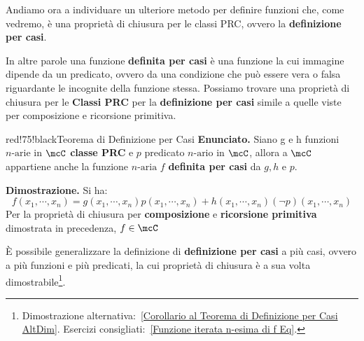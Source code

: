Andiamo ora a individuare un ulteriore metodo per definire funzioni che, come vedremo, è una proprietà di chiusura per le classi PRC, ovvero la \textbf{definizione per casi}.


In altre parole una funzione \textbf{definita per casi} è una funzione la cui immagine dipende da un predicato, ovvero da una condizione che può essere vera o falsa riguardante le incognite della funzione stessa.
Possiamo trovare una proprietà di chiusura per le \textbf{Classi PRC} per la \textbf{definizione per casi} simile a quelle viste per composizione e ricorsione primitiva.

\begin{halfframedbox}{red!75!black}{Teorema di Definizione per Casi}\label{Definizione per Casi Teorema}
  \textbf{Enunciato.} Siano g e h funzioni \(n\text{-arie}\) in \(\mcC\) \textbf{classe PRC} e \(p\) predicato \(n\text{-ario}\) in \(\mcC\), allora a \(\mcC\) appartiene anche la funzione \(n\text{-aria}\) \(f\) \textbf{definita per casi} da \(g,h\) e \(p\).

  \begin{center}
    \textcolor{red!75!black}{\hdashrule[0.5ex]{18cm}{1pt}{3mm 3pt 1mm 2pt}}
  \end{center}

  \textbf{Dimostrazione.} Si ha:
  \begin{equation}
    f(x_1,\cdots,x_n)=g(x_1,\cdots,x_n)p(x_1,\cdots,x_n)+h(x_1,\cdots,x_n)(\neg p)(x_1,\cdots,x_n)
  \end{equation}
  Per la proprietà di chiusura per \textbf{composizione} e \textbf{ricorsione primitiva} dimostrata in precedenza, \(f\in\mcC\)
\end{halfframedbox}

È possibile generalizzare la definizione di \textbf{definizione per casi} a più casi, ovvero a più funzioni e più predicati, la cui proprietà di chiusura è  a sua volta dimostrabile\footnote{Dimostrazione alternativa:~\ref{Corollario al Teorema di Definizione per Casi AltDim}. Esercizi consigliati:~\ref{Funzione iterata n-esima di f Eq}.}.


